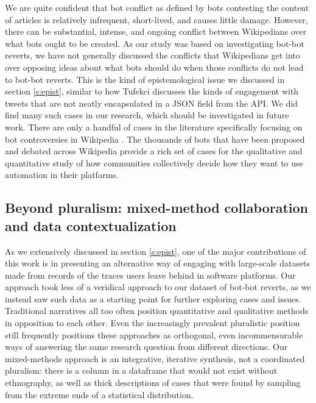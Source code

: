 \documentclass[format=acmsmall, review=false, screen=true]{acmart}%
\begin{document}
We are quite confident that bot conflict as defined by bots contesting the content of articles is relatively infrequent, short-lived, and causes little damage. However, there can be substantial, intense, and ongoing conflict between Wikipedians over what bots ought to be created. As our study was based on investigating bot-bot reverts, we have not generally discussed the conflicts that Wikipedians get into over opposing ideas about what bots should do when those conflicts do not lead to bot-bot reverts. This is the kind of epistemological issue we discussed in section \ref{s:epist}, similar to how Tufekci \cite{Tufekci2014} discusses the kinds of engagement with tweets that are not neatly encapsulated in a JSON field from the API. We did find many such cases in our research, which should be investigated in future work. There are only a handful of cases in the literature specifically focusing on bot controversies in Wikipedia \cite{Geiger2011,Muller-Birn2013}. The thousands of bots that have been proposed and debated across Wikipedia provide a rich set of cases for the qualitative and quantitative study of how communities collectively decide how they want to use automation in their platforms.


\subsection{Beyond pluralism: mixed-method collaboration and data contextualization}  
As we extensively discussed in section \ref{s:epist}, one of the major contributions of this work is in presenting an alternative way of engaging with large-scale datasets made from records of the traces users leave behind in software platforms. Our approach took less of a veridical approach to our dataset of bot-bot reverts, as we instead saw such data as a starting point for further exploring cases and issues. Traditional narratives all too often position quantitative and qualitative methods in opposition to each other. Even the increasingly prevalent pluralistic position still frequently positions these approaches as orthogonal, even incommensurable ways of answering the same research question from different directions. Our mixed-methods approach is an integrative, iterative synthesis, not a coordinated pluralism: there is a column in a dataframe that would not exist without ethnography, as well as thick descriptions of cases that were found by sampling from the extreme ends of a statistical distribution. 
\end{document}
